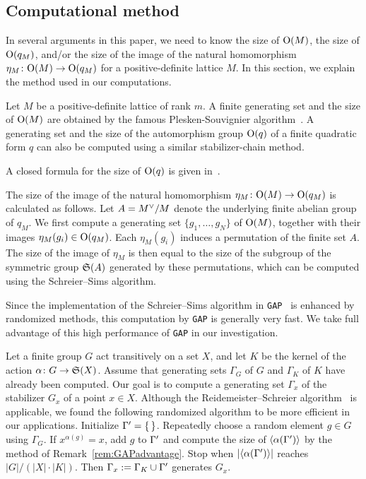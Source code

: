 \documentclass{amsart} %
\begin{document}
\subsection{Computational method}\label{subsec:computational}
%
In several arguments in this paper, 
we need to know the size of $\mathord{\mathrm{O}}(M)$,
the size of $\mathord{\mathrm{O}}(q_M)$, and/or 
the size of the image of the natural homomorphism
$\eta_M\colon \mathord{\mathrm{O}}(M) \to \mathord{\mathrm{O}}(q_M)$
for a positive-definite lattice $M$.
In this section, we explain the method used in our computations.
%
\par
%
Let $M$ be a positive-definite lattice of rank $m$.
A finite generating set 
and the size of $\mathord{\mathrm{O}}(M)$ are obtained by the famous Plesken-Souvignier algorithm~\cite{MR1484483}.
A generating set and the size of the automorphism group $\mathord{\mathrm{O}}(q)$ of a finite quadratic form 
$q$ can also be computed using a similar stabilizer-chain method.
%
\begin{remark}
A closed formula for the size of $\mathord{\mathrm{O}}(q)$ is given in~\cite[Theorem 5.2]{MR4730253}.
\end{remark}
%
%
The size of the image of 
the natural homomorphism $\eta_M\colon \mathord{\mathrm{O}}(M)\to \mathord{\mathrm{O}}(q_M)$ is calculated as follows.
Let $A=M^{\vee}/M$ denote the underlying finite abelian group of $q_M$.
We first compute a generating set $\{g_1, \dots, g_N\}$ of $\mathord{\mathrm{O}}(M)$,
together with their images $\eta_M(g_i)\in \mathord{\mathrm{O}}(q_M)$.
Each $\eta_M(g_i)$ induces a permutation of the finite set $A$.
The size of the image of $\eta_M$ is 
then equal to the size of the subgroup of 
the symmetric group $\mathord{\mathfrak{S}}(A)$ generated by these permutations,
which can be computed using the Schreier--Sims algorithm.
%
\begin{remark}\label{rem:GAPadvantage}
Since the implementation of the Schreier--Sims algorithm in {\tt GAP}~\cite{GAP4} is enhanced by randomized methods,
this computation by {\tt GAP} is generally very fast.
We take full advantage of this high performance of {\tt GAP} in our investigation.
\end{remark}
%
%
\begin{remark}\label{rem:gensofstab}
Let a finite group $G$ act transitively on a set $X$,
and let $K$ be the kernel of the action $\alpha\colon G\to \mathord{\mathfrak{S}}(X)$.
Assume that generating sets $\Gamma_G$ of $G$ and $\Gamma_K$ of $K$ 
have already been computed.
Our goal is to compute a generating set 
$\Gamma_x$ of the stabilizer $G_x$ of a point $x\in X$.
Although the Reidemeister--Schreier algorithm~\cite[Chapter 2]{MR2109550}
is applicable, 
we found the following randomized algorithm to be more efficient
in our applications.
Initialize $\Gamma^{\prime}=\{\,\}$. 
Repeatedly choose a random element $g\in G$
using $\Gamma_G$. 
If $x^{\alpha(g)}=x$, add $g$ to $\Gamma^{\prime}$ and compute the size
of $\langle\alpha(\Gamma^{\prime})\rangle$ by the method of Remark~\ref{rem:GAPadvantage}.
Stop when $|\langle\alpha(\Gamma^{\prime})\rangle|$ reaches $|G|/({|X|\cdot |K|})$.
Then
$\Gamma_x:=\Gamma_K\cup\Gamma^{\prime}$
generates $G_x$.
\end{remark}
%
%
\end{document}

